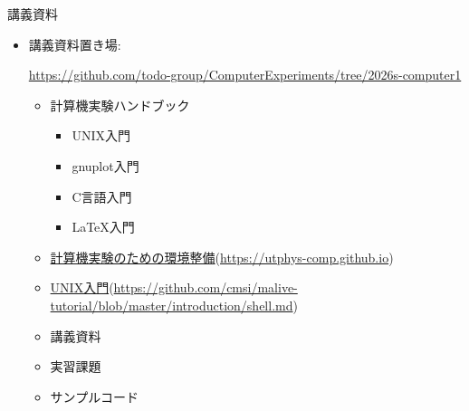 \begin{frame}[t]{講義資料}
  \begin{itemize}
  \item 講義資料置き場:
  
    {\footnotesize \href{https://github.com/todo-group/ComputerExperiments/tree/2026s-computer1}{https://github.com/todo-group/ComputerExperiments/tree/2026s-computer1}}
    \begin{itemize}
    \item 計算機実験ハンドブック
      \begin{itemize}
      \item UNIX入門
      \item gnuplot入門
      \item C言語入門
      \item \LaTeX 入門
      \end{itemize}
    \item \href{https://utphys-comp.github.io}{計算機実験のための環境整備}({\small \href{https://utphys-comp.github.io}{https://utphys-comp.github.io}})
    \item \href{https://github.com/cmsi/malive-tutorial/blob/master/introduction/shell.md}{UNIX入門}({\small \href{https://github.com/cmsi/malive-tutorial/blob/master/introduction/shell.md}{https://github.com/cmsi/malive-tutorial/blob/master/introduction/shell.md}})
    \item 講義資料
    \item 実習課題
    \item サンプルコード
    \end{itemize}
  \end{itemize}
\end{frame}

